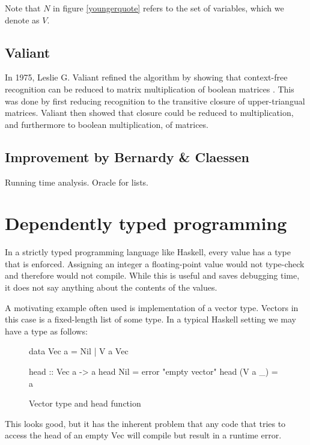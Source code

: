 \documentclass[a4paper,12pt,twosided]{report}
\begin{document}
Note that $N$ in figure \ref{youngerquote} refers to the set of variables, which
we denote as $V$. 

\subsection{Valiant}
In 1975, Leslie G. Valiant refined the algorithm by showing that context-free
recognition can be reduced to matrix multiplication of boolean matrices
\cite{Valiant75}. This was done by first reducing recognition to the transitive
closure of upper-triangual matrices. Valiant then showed that closure could be
reduced to multiplication, and furthermore to boolean multiplication, of
matrices. 

\subsection{Improvement by Bernardy \& Claessen}
Running time analysis. Oracle for lists. 

\section{Dependently typed programming}
In a strictly typed programming language like Haskell, every value has a type
that is enforced. Assigning an integer a floating-point value would not
type-check and therefore would not compile. While this is useful and saves
debugging time, it does not say anything about the contents of the values.

A motivating example often used is implementation of a vector type. Vectors in
this case is a fixed-length list of some type. In a typical Haskell setting we 
may have a type as follows:
\begin{figure}[H]
\begin{code}
data Vec a = Nil | V a Vec

head :: Vec a -> a
head Nil = error "empty vector"
head (V a _) = a
\end{code}
\caption{Vector type and head function}
\end{figure}
This looks good, but it has the inherent problem that any code that tries to
access the head of an empty Vec will compile but result in a runtime error. 
\end{document}
